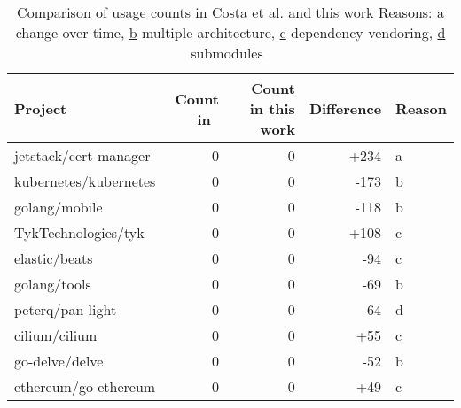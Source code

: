 \begin{table}[h]
    \centering
    \caption[Comparison of \unsafe{} usage counts Costa et al. and this work]%
    {Comparison of \unsafe{} usage counts in Costa et al. and this work \newline \footnotesize
    Reasons: \underline{a} change over time, \underline{b} multiple architecture, \underline{c} dependency vendoring,
    \underline{d} submodules~\newline}
    \label{tbl:costa-counts-comparison}
    \begin{tabular}{l|r|r|r|l}
        \toprule
        Project & Count in~\cite{costa2020} & Count in this work & Difference & Reason \\
        \midrule
        jetstack/cert-manager  & 0  & 0  & +234  & a \\
        kubernetes/kubernetes  & 0  & 0  & -173  & b \\
        golang/mobile          & 0  & 0  & -118  & b \\
        TykTechnologies/tyk    & 0  & 0  & +108  & c \\
        elastic/beats          & 0  & 0  & -94   & c \\
        golang/tools           & 0  & 0  & -69   & b \\
        peterq/pan-light       & 0  & 0  & -64   & d \\
        cilium/cilium          & 0  & 0  & +55   & c \\
        go-delve/delve         & 0  & 0  & -52   & b \\
        ethereum/go-ethereum   & 0  & 0  & +49   & c \\
        \bottomrule
    \end{tabular}
\end{table}